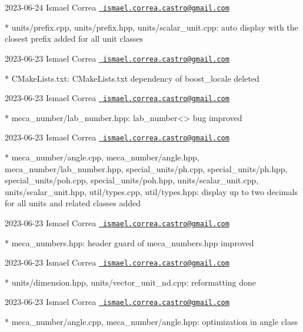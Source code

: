  2023-\/06-\/24 Ismael Correa \href{mailto:ismael.correa.castro@gmail.com}{\texttt{ ismael.\+correa.\+castro@gmail.\+com}} \begin{DoxyVerb}* units/prefix.cpp, units/prefix.hpp, units/scalar_unit.cpp: auto
display with the closest prefix added for all unit classes
\end{DoxyVerb}
 2023-\/06-\/23 Ismael Correa \href{mailto:ismael.correa.castro@gmail.com}{\texttt{ ismael.\+correa.\+castro@gmail.\+com}} \begin{DoxyVerb}* CMakeLists.txt: CMakeLists.txt dependency of boost_locale deleted
\end{DoxyVerb}
 2023-\/06-\/23 Ismael Correa \href{mailto:ismael.correa.castro@gmail.com}{\texttt{ ismael.\+correa.\+castro@gmail.\+com}} \begin{DoxyVerb}* meca_number/lab_number.hpp: lab_number<> bug improved
\end{DoxyVerb}
 2023-\/06-\/23 Ismael Correa \href{mailto:ismael.correa.castro@gmail.com}{\texttt{ ismael.\+correa.\+castro@gmail.\+com}} \begin{DoxyVerb}* meca_number/angle.cpp, meca_number/angle.hpp,
meca_number/lab_number.hpp, special_units/ph.cpp,
special_units/ph.hpp, special_units/poh.cpp, special_units/poh.hpp,
units/scalar_unit.cpp, units/scalar_unit.hpp, util/types.cpp,
util/types.hpp: display up to two decimals for all units and related
classes added
\end{DoxyVerb}
 2023-\/06-\/23 Ismael Correa \href{mailto:ismael.correa.castro@gmail.com}{\texttt{ ismael.\+correa.\+castro@gmail.\+com}} \begin{DoxyVerb}* meca_numbers.hpp: header guard of meca_numbers.hpp improved
\end{DoxyVerb}
 2023-\/06-\/23 Ismael Correa \href{mailto:ismael.correa.castro@gmail.com}{\texttt{ ismael.\+correa.\+castro@gmail.\+com}} \begin{DoxyVerb}* units/dimension.hpp, units/vector_unit_nd.cpp: reformatting done
\end{DoxyVerb}
 2023-\/06-\/23 Ismael Correa \href{mailto:ismael.correa.castro@gmail.com}{\texttt{ ismael.\+correa.\+castro@gmail.\+com}} \begin{DoxyVerb}* meca_number/angle.cpp, meca_number/angle.hpp: optimization in
angle class
\end{DoxyVerb}

